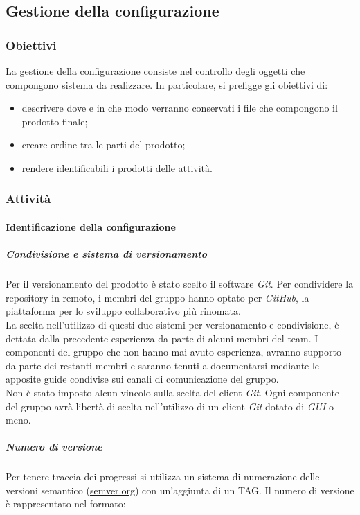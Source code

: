 \subsection{Gestione della configurazione}
\subsubsection{Obiettivi}
La gestione della configurazione consiste nel controllo degli oggetti che compongono sistema da realizzare. In particolare, si prefigge gli obiettivi di:
\begin{itemize}
	\item descrivere dove e in che modo verranno conservati i file che compongono il prodotto finale;
	\item creare ordine tra le parti del prodotto;
	\item rendere identificabili i prodotti delle attività.
\end{itemize}

\subsubsection{Attività}
\paragraph{Identificazione della configurazione}
\subparagraph*{Condivisione e sistema di versionamento\glo}
Per il versionamento del prodotto è stato scelto il software \textit{Git\glos}. Per condividere la repository in remoto, i membri del gruppo hanno optato per \textit{GitHub\glos}, la piattaforma per lo sviluppo collaborativo più rinomata. \\

\noindent La scelta nell'utilizzo di questi due sistemi per versionamento e condivisione, è dettata dalla precedente esperienza da parte di alcuni membri del team. I componenti del gruppo che non hanno mai avuto esperienza, avranno supporto da parte dei restanti membri e saranno tenuti a documentarsi mediante le apposite guide condivise sui canali di comunicazione del gruppo. \\

\noindent Non è stato imposto alcun vincolo sulla scelta del client \textit{Git\glos}. Ogni componente del gruppo avrà libertà di scelta nell'utilizzo di un client \textit{Git\glo} dotato di \textit{GUI\glo} o meno.

\subparagraph*{Numero di versione}
Per tenere traccia dei progressi si utilizza un sistema di numerazione delle versioni
semantico (\href{https://semver.org/lang/it/}{semver.org}) con un'aggiunta di un TAG.
Il numero di versione è rappresentato nel formato:\\\\

